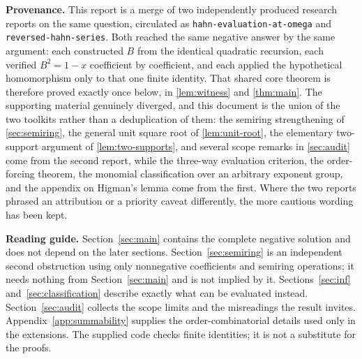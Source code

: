 \documentclass[11pt,letterpaper]{article}
\theoremstyle{definition}
\theoremstyle{remark}
\begin{document}
\begin{titlepage}
\vspace{.16in}
\noindent\textbf{Provenance.}
This report is a merge of two independently produced research reports on the
same question, circulated as \texttt{hahn-evaluation-at-omega} and
\texttt{reversed-hahn-series}. Both reached the same negative answer by the
same argument: each constructed $B$ from the identical quadratic recursion,
each verified $B^2=1-x$ coefficient by coefficient, and each applied the
hypothetical homomorphism only to that one finite identity. That shared core
theorem is therefore proved exactly once below, in \cref{lem:witness} and
\cref{thm:main}. The supporting material genuinely diverged, and this document
is the union of the two toolkits rather than a deduplication of them: the
semiring strengthening of \cref{sec:semiring}, the general unit square root
of \cref{lem:unit-root}, the elementary two-support argument of
\cref{lem:two-supports}, and several scope remarks in \cref{sec:audit} come
from the second report, while the three-way evaluation criterion, the
order-forcing theorem, the monomial classification over an arbitrary exponent
group, and the appendix on Higman's lemma come from the first. Where the two
reports phrased an attribution or a priority caveat differently, the more
cautious wording has been kept.
\vfill
{}
\end{titlepage}

\tableofcontents
\vspace{1.0em}
\begin{resultbox}
\textbf{Reading guide.} Section~\ref{sec:main} contains the complete negative
solution and does not depend on the later sections.
Section~\ref{sec:semiring} is an independent second obstruction using only
nonnegative coefficients and semiring operations; it needs nothing from
Section~\ref{sec:main} and is not implied by it. Sections~\ref{sec:inf}
and~\ref{sec:classification} describe exactly what can be evaluated instead.
Section~\ref{sec:audit} collects the scope limits and the misreadings the
result invites. Appendix~\ref{app:summability} supplies the order-combinatorial
details used only in the extensions. The supplied code checks finite identities;
it is not a substitute for the proofs.
\end{resultbox}
\clearpage
\end{document}
